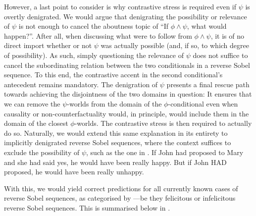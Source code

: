 \noindent However, a last point to consider is why contrastive stress is required even if $\psi$ is overtly denigrated. We would argue that denigrating the possibility or relevance of $\psi$ is not enough to cancel the aboutness topic of \enquote{If $\phi\land\psi$, what would happen?}. After all, when discussing what were to follow from $\phi\land\psi$, it is of no direct import whether or not $\psi$ was actually possible (and, if so, to which degree of possibility). As such, simply questioning the relevance of $\psi$ does not suffice to cancel the subordinating relation between the two conditionals in a reverse Sobel sequence. To this end, the contrastive accent in the second conditional's antecedent remains mandatory. The denigration of $\psi$ presents a final rescue path towards achieving the disjointness of the two domains in question: It ensures that we can remove the $\psi$-worlds from the domain of the $\phi$-conditional even when causality or non-counterfactuality would, in principle, would include them in the domain of the closest $\phi$-worlds. The contrastive stress is then required to actually do so. Naturally, we would extend this same explanation in its entirety to implicitly denigrated reverse Sobel sequences, where the context suffices to exclude the possibility of $\psi$, such as the one in .
\pex\label{ex:moss1}
\a If John had proposed to Mary and she had said yes, he would have been really happy.
\a But if John \MakeUppercase{had} proposed, he would have been really unhappy.\\\emptyfill\parencite[adopted from][p.~577]{Moss2012}
\xe

With this, we would yield correct predictions for all currently known cases of reverse Sobel sequences, as categorised by ---be they felicitous or infelicitous reverse Sobel sequences. This is summarised below in .
\begin{table}[!htb]
\end{table}

